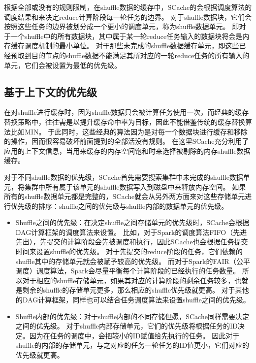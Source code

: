根据全部或没有的规则限制，在shuffle数据的缓存中，SCache的会根据调度算法的调度结果和来决定reduce计算阶段每一轮任务的边界。
对于shuffle数据块，它们会按照这些任务的边界被划分成一个更小的调度单元，称为shuffle数据单元。
即对于一个shuffle中的所有数据块，其中属于某一轮reduce任务输入的数据块将会是内存缓存调度机制的最小单位。
对于那些未完成的shuffle数据缓存单元，即这些已经预取到目的节点的shuffle数据不能满足其所对应的一轮reduce任务的所有输入的单元，它们会被设置为最低的优先级。


\subsection{基于上下文的优先级}

在对shuffle进行缓存时，因为shuffle数据只会被计算任务使用一次，而经典的缓存替换策略中，往往需是以提升缓存命中率为目标，因此不能借鉴传统的缓存替换算法比如MIN\cite{min}。
于此同时，这些经典的算法因为是对每一个数据块进行缓存和移除的操作，因而很容易破坏前面提到的全部活没有规则。
在这里SCache充分利用了应用的上下文信息，当用来缓存的内存空间饱和时来选择被剔除的内存shuffle数据缓存。

对于不同shuffle数据的优先级，SCache首先需要搜索集群中未完成的shuffle数据单元，将集群中所有属于该单元的shuffle数据写入到磁盘中来释放内存空间。
如果所有的shuffle数据单元都是完整的，SCache就会从另外两方面来对这些存储单元进行优先级的排序：shuffle之间的优先级与shuffle内部的数据单元的优先级。

\begin{itemize}
	\item Shuffle之间的优先级：在决定shuffle之间存储单元的优先级时，SCache会根据DAG计算框架的调度算法来设置。
	比如，对于Spark的调度算法FIFO（先进先出），先提交的计算阶段会先被调度和执行，因此SCache也会根据任务提交时间来设置shuffle的优先级。
	对于先提交的reduce阶段的任务，它们依赖的shuffle其中的存储单元就会被赋予较高的优先级。
	而对于Spark的FAIR（公平调度）调度算法，Spark会尽量平衡每个计算阶段的已经执行的任务数量。
	所以对于相应的shuffle存储单元，如果其对应的计算阶段的剩余任务较多，也就是剩余的shuffle的存储单元更多，那么相应的shuffle优先级就更高。
	对于其他的DAG计算框架，同样也可以结合任务调度算法来设置shuffle之间的优先级。
	\item Shuffle内部的优先级：对于shuffle内部的不同存储但愿，SCache同样需要决定之间的优先级。
	对于shuffle内部存储单元，它们的优先级将根据任务的ID决定。因为在任务的调度中，会把较小的ID赋值给先执行的任务。
	因此对于shuffle的内部的存储单元，与之对应的任务一轮任务的ID值更小，它们对应的优先级就更高。
\end{itemize}

